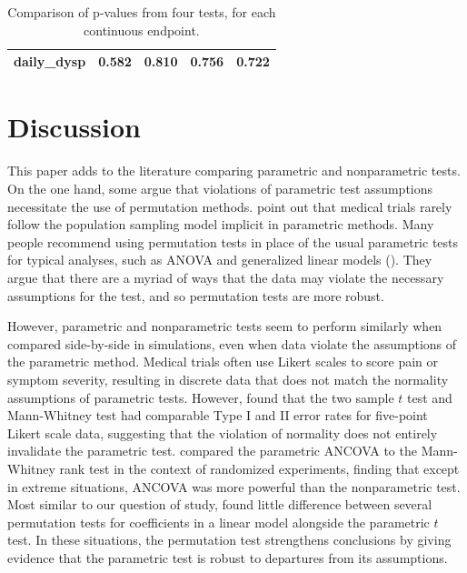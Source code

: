 \documentclass[12pt]{article}
\begin{document}
\begin{table}[]
\begin{tabular}{l|cccc}
daily\_dysp   & 0.582                      & 0.810                                                                                & 0.756                                                                        & 0.722                                                                        \\
\hline
\end{tabular}
\caption{Comparison of p-values from four tests, for each continuous endpoint.} 
\end{table}

\section{Discussion}\label{sec:discussion}



This paper adds to the literature comparing parametric and nonparametric tests.
On the one hand, some argue that violations of parametric test assumptions necessitate the use of permutation methods.
\cite{ludbrook_why_1998} point out that medical trials rarely follow the population sampling model implicit in parametric methods.
Many people recommend using permutation tests in place of the usual parametric tests for typical analyses, such as ANOVA and generalized linear models (\cite{still_approximate_1981, winkler_permutation_2014}).
They argue that there are a myriad of ways that the data may violate the necessary assumptions for the test, and so permutation tests are more robust.

However, parametric and nonparametric tests seem to perform similarly when compared side-by-side in simulations, even when data violate the assumptions of the parametric method.
Medical trials often use Likert scales to score pain or symptom severity, resulting in discrete data that does not match the normality assumptions of parametric tests.
However, \cite{winter_five-point_2010} found that the two sample $t$ test and Mann-Whitney test had comparable Type I and II error rates for five-point Likert scale data, suggesting that the violation of normality does not entirely invalidate the parametric test.
\cite{vickers_parametric_2005} compared the parametric ANCOVA to the Mann-Whitney rank test in the context of randomized experiments, finding that except in extreme situations, ANCOVA was more powerful than the nonparametric test.
Most similar to our question of study, \cite{anderson_empirical_1999} found little difference between several permutation tests for coefficients in a linear model alongside the parametric $t$ test.
In these situations, the permutation test strengthens conclusions by giving evidence that the parametric test is robust to departures from its assumptions.
\end{document}
